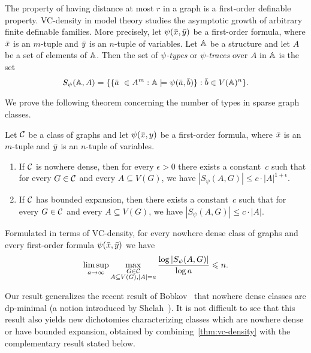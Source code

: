 The property of having distance at most $r$ in a graph is 
a first-order definable property. 
VC-density in model theory studies the asymptotic growth 
of arbitrary finite definable families. More precisely, 
let $\psi(\bar{x},\bar{y})$ be a first-order formula, where 
$\bar{x}$ is an $m$-tuple and $\bar{y}$ is an $n$-tuple of variables. 
Let $\mathbb{A}$ be a structure and let $A$ be a set of elements of
$\mathbb{A}$. Then the set of \emph{$\psi$-types} or 
\emph{$\psi$-traces} over $A$ in 
$\mathbb{A}$ is the set
\[S_\psi(\mathbb{A},A)=\{\{\bar{a}\ \in A^m : \mathbb{A}\models\psi(\bar{a},\bar{b})\} : \bar{b}\in V(\mathbb{A})^n\}.\]

We prove the following theorem concerning the number of
types in sparse graph classes. 

\begin{theorem}\label{thm:vc-density}
Let $\mathcal{C}$ be a class of graphs and let $\psi(\bar{x},y)$ be a first-order formula, where 
$\bar{x}$ is an $m$-tuple and $\bar{y}$ is an $n$-tuple of variables. 
\begin{enumerate}
\item If $\mathcal{C}$ is nowhere dense, then for every $\epsilon>0$ 
there exists a constant~$c$ such that for every $G\in \mathcal{C}$ and every
$A\subseteq V(G)$, we have $|S_\psi(A,G)|\leq c\cdot |A|^{1+\epsilon}.$

\item If $\mathcal{C}$ has bounded expansion, then there exists a constant~$c$ such that for every $G\in \mathcal{C}$ and every $A\subseteq V(G)$, we have $|S_\psi(A,G)|\leq c\cdot |A|$.
\end{enumerate}
\end{theorem}

Formulated in terms of VC-density, for every nowhere 
dense class of graphs and every first-order formula $\psi(\bar{x},\bar{y})$
we have 
\[\limsup_{a\rightarrow \infty}\max_{\substack{G\in\mathcal{C}\\A\subseteq
    V(G), |A|=a}}\frac{\log |S_\psi(A,G)|}{\log a}\leqslant n.\]

Our result generalizes the recent result of Bobkov~\cite{bobkov2017computations} that nowhere dense classes
are dp-minimal (a notion introduced by Shelah~\cite{shelah2014strongly}).
%
%
%
%
%
%
It is not difficult to see that this result also yields new dichotomies 
characterizing classes which are nowhere dense  or have bounded expansion, obtained by combining~\cref{thm:vc-density}
with the complementary result stated below.

